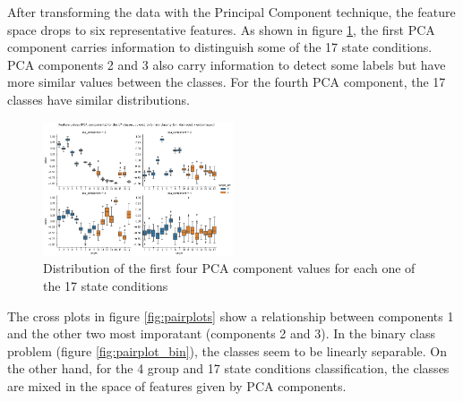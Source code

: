 \documentclass[twocolumn]{article}
\begin{document}
After transforming the data with the Principal Component technique, the feature space drops to six representative features. As shown in figure \ref{fig:exploratory_01}, the first PCA component carries information to distinguish some of the 17 state conditions. PCA components 2 and 3 also carry information to detect some labels but have more similar values between the classes. For the fourth PCA component, the 17 classes have similar distributions.

\begin{figure}[H]
      \centering
      \includegraphics[width=0.5\textwidth]{exploratory_01.png}
      \caption{Distribution of the first four PCA component values for each one of the 17 state conditions}
      \label{fig:exploratory_01}
\end{figure}

The cross plots in figure \ref{fig:pairplots} show a relationship between components 1 and the other two most imporatant (components 2 and 3). In the binary class problem (figure \ref{fig:pairplot_bin}), the classes seem to be linearly separable. On the other hand, for the 4 group and 17 state conditions classification, the classes are mixed in the space of features given by PCA components.
\end{document}
